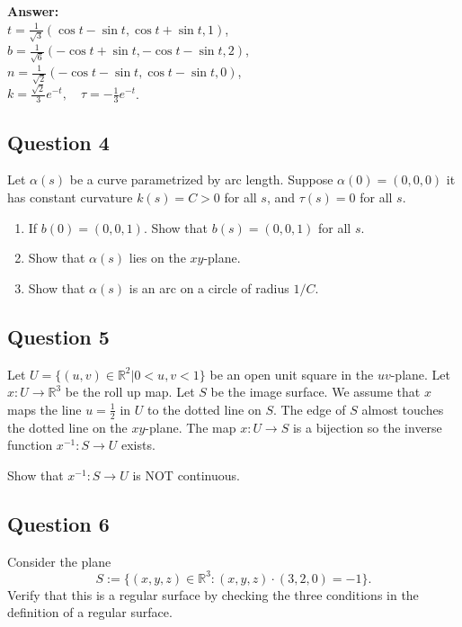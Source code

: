 \documentclass[12pt, a4paper]{article}
\newcommand{\R}{\mathbb{R}}
\begin{document}
\vspace{1em}
\noindent\textbf{Answer:}\\
$t=\frac{1}{\sqrt{3}}(\cos t-\sin t,\cos t+\sin t,1)$,\\
$b=\frac{1}{\sqrt{6}}(-\cos t+\sin t,-\cos t-\sin t,2)$,\\
$n=\frac{1}{\sqrt{2}}(-\cos t-\sin t,\cos t-\sin t,0)$,\\
$k=\frac{\sqrt{2}}{3}e^{-t}, \quad \tau=-\frac{1}{3}e^{-t}$.
\newpage

\subsection*{Question 4}
Let $\alpha(s)$ be a curve parametrized by arc length. Suppose $\alpha(0)=(0,0,0)$ it has constant curvature $k(s)=C>0$ for all $s$, and $\tau(s)=0$ for all $s$.
\begin{enumerate}[label=(\roman*)]
    \item If $b(0)=(0,0,1)$. Show that $b(s)=(0,0,1)$ for all $s$.
    \item Show that $\alpha(s)$ lies on the $xy$-plane.
    \item Show that $\alpha(s)$ is an arc on a circle of radius $1/C$.
\end{enumerate}
\newpage

\subsection*{Question 5}
Let $U=\{(u,v)\in\R^{2}|0<u,v<1\}$ be an open unit square in the $uv$-plane. Let $x:U\rightarrow\R^{3}$ be the roll up map. Let $S$ be the image surface. We assume that $x$ maps the line $u=\frac{1}{2}$ in $U$ to the dotted line on $S$. The edge of $S$ almost touches the dotted line on the $xy$-plane. The map $x: U\rightarrow S$ is a bijection so the inverse function $x^{-1}: S\rightarrow U$ exists. 

Show that $x^{-1}: S\rightarrow U$ is NOT continuous.
\newpage

\subsection*{Question 6}
Consider the plane
\[ S:=\{(x,y,z)\in\R^{3}:(x,y,z)\cdot(3,2,0)=-1\}. \]
Verify that this is a regular surface by checking the three conditions in the definition of a regular surface.
\newpage
\end{document}
